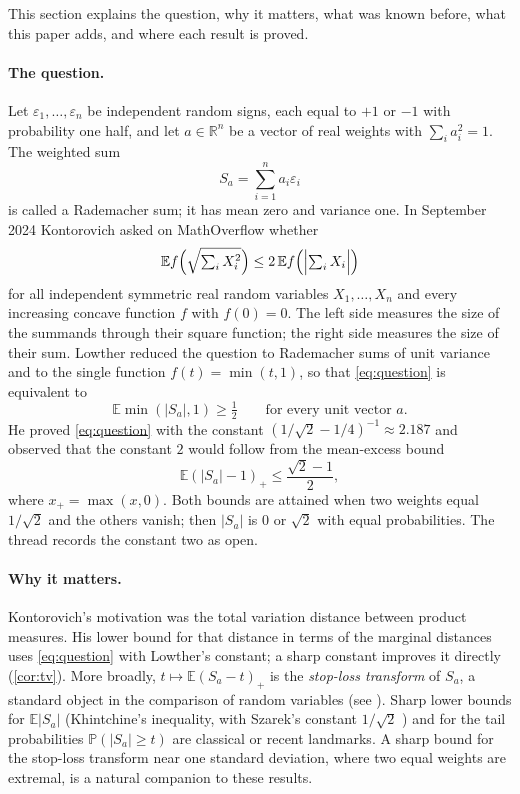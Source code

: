 \documentclass[11pt,a4paper]{article}
\numberwithin{equation}{section}
\theoremstyle{remark}
\newcommand{\E}{\mathbb E}
\newcommand{\PP}{\mathbb P}
\newcommand{\R}{\mathbb R}
\begin{document}
This section explains the question, why it matters, what was known before,
what this paper adds, and where each result is proved.

\paragraph{The question.}
Let $\varepsilon_1,\ldots,\varepsilon_n$ be independent random signs, each
equal to $+1$ or $-1$ with probability one half, and let $a\in\R^n$ be a
vector of real weights with $\sum_ia_i^2=1$. The weighted sum
\[
S_a=\sum_{i=1}^n a_i\varepsilon_i
\]
is called a Rademacher sum; it has mean zero and variance one. In September
2024 Kontorovich asked on MathOverflow \cite{Kontorovich} whether
\begin{equation}\label{eq:question}
 \E f\Bigl(\sqrt{\textstyle\sum_i X_i^2}\Bigr)\le 2\,\E f\Bigl(\Bigl|\textstyle\sum_i X_i\Bigr|\Bigr)
\end{equation}
for all independent symmetric real random variables $X_1,\ldots,X_n$ and every
increasing concave function $f$ with $f(0)=0$. The left side measures the
size of the summands through their square function; the right side measures
the size of their sum. Lowther \cite{Lowther} reduced the question to Rademacher
sums of unit variance and to the single function $f(t)=\min(t,1)$, so that
\eqref{eq:question} is equivalent to
\begin{equation}\label{eq:clip}
 \E\min(|S_a|,1)\ge\tfrac12\qquad\text{for every unit vector }a .
\end{equation}
He proved \eqref{eq:question} with the constant $(1/\sqrt2-1/4)^{-1}\approx2.187$
and observed that the constant $2$ would follow from the mean-excess bound
\begin{equation}\label{eq:lowther}
 \E(|S_a|-1)_+\le\frac{\sqrt2-1}{2},
\end{equation}
where $x_+=\max(x,0)$. Both bounds are attained when two weights equal
$1/\sqrt2$ and the others vanish; then $|S_a|$ is $0$ or $\sqrt2$ with equal
probabilities. The thread records the constant two as open.

\paragraph{Why it matters.}
Kontorovich's motivation was the total variation distance between product
measures. His lower bound for that distance in terms of the marginal
distances \cite{KontorovichTV} uses \eqref{eq:question} with Lowther's
constant; a sharp constant improves it directly
(\cref{cor:tv}). More broadly, $t\mapsto\E(S_a-t)_+$ is the
\emph{stop-loss transform} of $S_a$, a standard object in the comparison
of random variables (see \cite[Section~II]{YuLevel}). Sharp lower bounds for
$\E|S_a|$ (Khintchine's inequality, with Szarek's constant $1/\sqrt2$
\cite{Szarek}) and for the tail probabilities $\PP(|S_a|\ge t)$
\cite{HP} are classical or recent landmarks. A sharp bound for the
stop-loss transform near one standard deviation, where two equal weights are
extremal, is a natural companion to these results.
\end{document}
